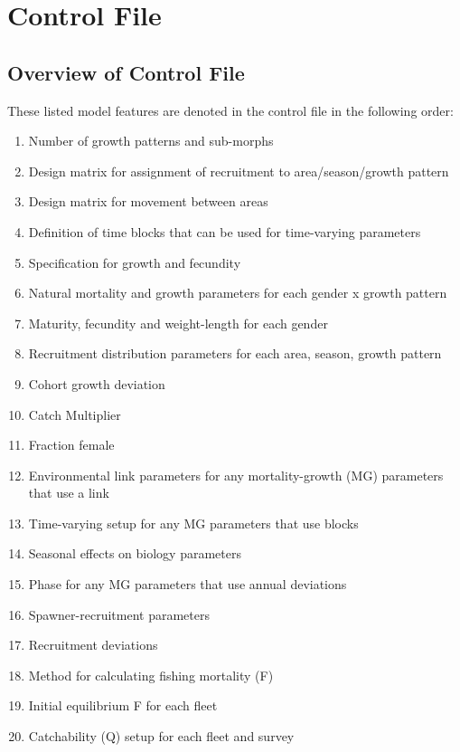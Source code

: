 \section{Control File}
\subsection{Overview of Control File}
These listed model features are denoted in the control file in the following order:
	\begin{enumerate}
		\itemsep0em
		\item Number of growth patterns and sub-morphs
		\item Design matrix for assignment of recruitment to area/season/growth pattern
		\item Design matrix for movement between areas
		\item Definition of time blocks that can be used for time-varying parameters
		\\
		\item Specification for growth and fecundity
		\item Natural mortality and growth parameters for each gender x growth pattern
		\item Maturity, fecundity and weight-length for each gender
		\item Recruitment distribution parameters for each area, season, growth pattern
		\item Cohort growth deviation
		\item Catch Multiplier
		\item Fraction female
		\item Environmental link parameters for any mortality-growth (MG) parameters that use a link
		\item Time-varying setup for any MG parameters that use blocks
		\item Seasonal effects on biology parameters
		\item Phase for any MG parameters that use annual deviations
		\\
		\item Spawner-recruitment parameters
		\item Recruitment deviations
		\\
		\item Method for calculating fishing mortality (F)
		\item Initial equilibrium F for each fleet
		\\
		\item Catchability (Q) setup for each fleet and survey

\end{enumerate}
